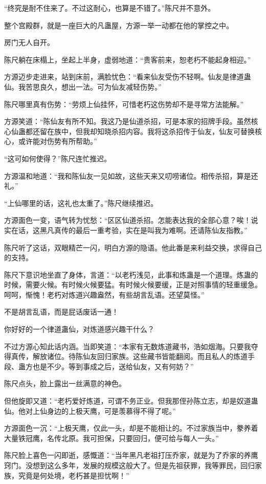 \begin{this_body}
“终究是耐不住来了。不过这耐心，也算是不错了。”陈尺并不意外。

整个宫殿群，就是一座巨大的凡蛊屋，方源一举一动都在他的掌控之中。

房门无人自开。

陈尺躺在床榻上，坐起上半身，虚弱地道：“贵客前来，恕老朽不能起身相迎。”

方源迈步走进来，站到床前，满脸忧色：“看来仙友受伤不轻啊。仙友是律道蛊仙。我苦思良久，想出一法。可为仙友减轻伤势。”

陈尺哪里真有伤势：“劳烦上仙挂怀，可惜老朽这伤势却不是寻常方法能解。”

方源笑道：“陈仙友有所不知。我这乃是仙道杀招，可是本家的招牌手段。虽然核心仙蛊都还留在族中，但我却知晓杀招内容。我将这杀招传于仙友，仙友可替换核心，或许能对伤势有所帮助。”

“这可如何使得？”陈尺连忙推迟。

方源温和地道：“我和陈仙友一见如故，这些天来又叨唠诸位。相传杀招，算是还礼。”

“上仙哪里的话，这礼也太重了。”陈尺继续推迟。

方源面色一变，语气转为忧愁：“区区仙道杀招。怎能表达我的全部心意？唉！说实在话，这黑凡真传的最后一重考验，实在是叫我为难啊。还请陈仙友指教。”

陈尺听了这话，双眼精芒一闪，明白方源的隐语。他此番是来利益交换，求得自己的支持。

陈尺下意识地坐直了身体，言道：“以老朽浅见，此事和炼蛊是一个道理。炼蛊的时候，需要火候。有时候火候要猛。有时候火候要缓，正是对照事情的轻重缓急。呵呵，惭愧！老朽对炼道兴趣盎然，有些胡言乱语。还望莫怪。”

不是胡言乱语，而是屁话废话一通！

你好好的一个律道蛊仙，对炼道感兴趣干什么？

不过方源心知此话内涵。当即笑道：“本家有无数炼道藏书，浩如烟海。只要我夺得真传，解放诸位。待陈仙友回归家族。这些藏书皆能翻阅。而且私人的炼道手段、蛊方也是不少。等到事成之后，送给仙友，又有何妨？”

陈尺点头，脸上露出一丝满意的神色。

但他旋即又道：“老朽爱好炼道，可谓不务正业。但我那侄孙陈立志，却是奴道蛊仙。他对上仙身边的上极天鹰，可是羡慕得不得了呢。”

方源面色一沉：“上极天鹰，仅此一头，却是不能相让的。不过家族当中，豢养着大量铁冠鹰，名传北原。我可担保，只要回归，便可给与每人一头。”

陈尺脸上喜色一闪即逝，感慨道：“当年黑凡老祖打压乔家，就是为了乔家的养鹰窍门。没想到这么多年，发展的规模这般大了。但是先祖获罪，我等罪民，回归家族，究竟是何处境，老朽甚是担忧啊！”


\end{this_body}
